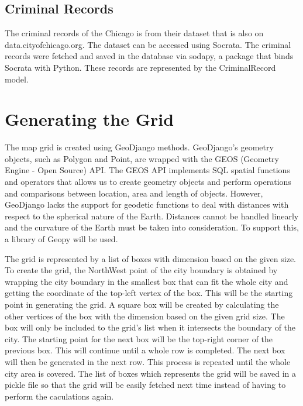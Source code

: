     \subsection{Criminal Records}
        The criminal records of the Chicago is from their dataset that is also on data.cityofchicago.org. The dataset can be accessed using Socrata. The criminal records were fetched and saved in the database via sodapy, a package that binds Socrata with Python. These records are represented by the CriminalRecord model.

\section{Generating the Grid}
    The map grid is created using GeoDjango methods. GeoDjango's geometry objects, such as Polygon and Point, are wrapped with the GEOS (Geometry Engine - Open Source) API. The GEOS API implements SQL spatial functions and operators that allows us to create geometry objects and perform operations and comparisons between location, area and length of objects. However, GeoDjango lacks the support for geodetic functions to deal with distances with respect to the spherical nature of the Earth. Distances cannot be handled linearly and the curvature of the Earth must be taken into consideration. To support this, a library of Geopy will be used.

    The grid is represented by a list of boxes with dimension based on the given size. To create the grid, the NorthWest point of the city boundary is obtained by wrapping the city boundary in the smallest box that can fit the whole city and getting the coordinate of the top-left vertex of the box. This will be the starting point in generating the grid. A square box will be created by calculating the other vertices of the box with the dimension based on the given grid size. The box will only be included to the grid's list when it intersects the boundary of the city. The starting point for the next box will be the top-right corner of the previous box. This will continue until a whole row is completed. The next box will then be generated in the next row. This process is repeated until the whole city area is covered. The list of boxes which represents the grid will be saved in a pickle file so that the grid will be easily fetched next time instead of having to perform the caculations again.

